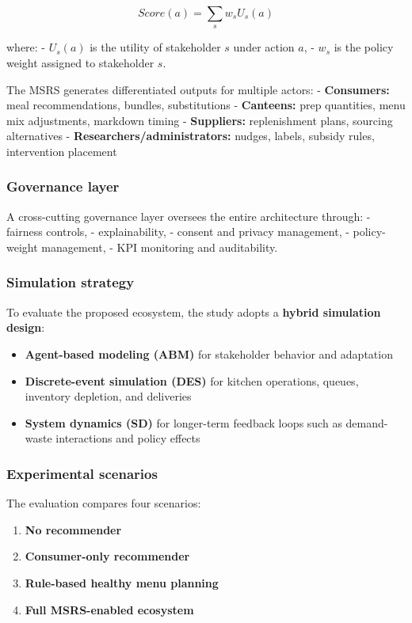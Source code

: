 \documentclass[
  letterpaper,
  DIV=11,
  numbers=noendperiod]{scrartcl}
\providecommand{\tightlist}{%
  \setlength{\itemsep}{0pt}\setlength{\parskip}{0pt}}
\begin{document}
\[
Score(a)=\sum_s w_s U_s(a)
\]

where: - \(U_s(a)\) is the utility of stakeholder \(s\) under action
\(a\), - \(w_s\) is the policy weight assigned to stakeholder \(s\).

The MSRS generates differentiated outputs for multiple actors: -
\textbf{Consumers:} meal recommendations, bundles, substitutions -
\textbf{Canteens:} prep quantities, menu mix adjustments, markdown
timing - \textbf{Suppliers:} replenishment plans, sourcing alternatives
- \textbf{Researchers/administrators:} nudges, labels, subsidy rules,
intervention placement

\subsubsection{Governance layer}\label{governance-layer}

A cross-cutting governance layer oversees the entire architecture
through: - fairness controls, - explainability, - consent and privacy
management, - policy-weight management, - KPI monitoring and
auditability.

\subsubsection{Simulation strategy}\label{simulation-strategy}

To evaluate the proposed ecosystem, the study adopts a \textbf{hybrid
simulation design}:

\begin{itemize}
\tightlist
\item
  \textbf{Agent-based modeling (ABM)} for stakeholder behavior and
  adaptation
\item
  \textbf{Discrete-event simulation (DES)} for kitchen operations,
  queues, inventory depletion, and deliveries
\item
  \textbf{System dynamics (SD)} for longer-term feedback loops such as
  demand-waste interactions and policy effects
\end{itemize}

\subsubsection{Experimental scenarios}\label{experimental-scenarios}

The evaluation compares four scenarios:

\begin{enumerate}
\def\labelenumi{\arabic{enumi}.}
\tightlist
\item
  \textbf{No recommender}
\item
  \textbf{Consumer-only recommender}
\item
  \textbf{Rule-based healthy menu planning}
\item
  \textbf{Full MSRS-enabled ecosystem}
\end{enumerate}
\end{document}
